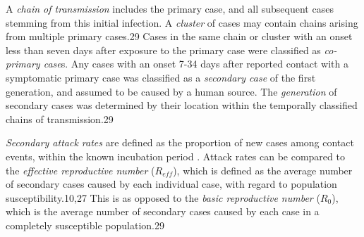 A \textit{chain of transmission} includes the primary case, and all subsequent cases stemming from this initial infection. A \textit{cluster} of cases may contain chains arising from multiple primary cases.29 Cases in the same chain or cluster with an onset less than seven days after exposure to the primary case were classified as \textit{co-primary case}s. Any cases with an onset 7-34 days after reported contact with a symptomatic primary case was classified as a \textit{secondary case} of the first generation, and assumed to be caused by a human source. The \textit{generation} of secondary cases was determined by their location within the temporally classified chains of transmission.29

\textit{Secondary attack rates} are defined as the proportion of new cases among contact events, within the known incubation period \cite{Dixon2015}. Attack rates can be compared to the \textit{effective reproductive number} ($R_{eff}$), which is defined as the average number of secondary cases caused by each individual case, with regard to population susceptibility.10,27 This is as opposed to the \textit{basic reproductive number} ($R_{0}$), which is the average number of secondary cases caused by each case in a completely susceptible population.29 